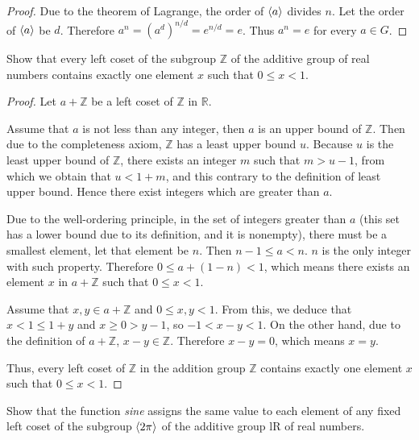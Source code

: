 \begin{proof}
    Due to the theorem of Lagrange, the order of $\left\langle{a}\right\rangle$ divides $n$. Let the order of $\left\langle{a}\right\rangle$ be $d$. Therefore $a^{n} = {(a^{d})}^{n/d} = e^{n/d} = e$. Thus $a^{n} = e$ for every $a\in G$.
\end{proof}

\newpage
\begin{exercise}
    Show that every left coset of the subgroup $\mathbb{Z}$ of the additive group of real numbers contains exactly one element $x$ such that $0\leq x < 1$.
\end{exercise}

\begin{proof}
    Let $a + \mathbb{Z}$ be a left coset of $\mathbb{Z}$ in $\mathbb{R}$.

    Assume that $a$ is not less than any integer, then $a$ is an upper bound of $\mathbb{Z}$. Then due to the completeness axiom, $\mathbb{Z}$ has a least upper bound $u$. Because $u$ is the least upper bound of $\mathbb{Z}$, there exists an integer $m$ such that $m > u - 1$, from which we obtain that $u < 1 + m$, and this contrary to the definition of least upper bound. Hence there exist integers which are greater than $a$.

    Due to the well-ordering principle, in the set of integers greater than $a$ (this set has a lower bound due to its definition, and it is nonempty), there must be a smallest element, let that element be $n$. Then $n - 1\leq a < n$. $n$ is the only integer with such property. Therefore $0\leq a + (1 - n) < 1$, which means there exists an element $x$ in $a + \mathbb{Z}$ such that $0\leq x < 1$.

    Assume that $x, y\in a + \mathbb{Z}$ and $0\leq x, y < 1$. From this, we deduce that $x < 1 \leq 1 + y$ and $x\ge 0 > y - 1$, so $-1 < x - y < 1$. On the other hand, due to the definition of $a + \mathbb{Z}$, $x - y\in\mathbb{Z}$. Therefore $x - y = 0$, which means $x = y$.

    Thus, every left coset of $\mathbb{Z}$ in the addition group $\mathbb{Z}$ contains exactly one element $x$ such that $0\leq x < 1$.
\end{proof}

\newpage
\begin{exercise}
    Show that the function \textit{sine} assigns the same value to each element of any fixed left coset of the subgroup $\left\langle{2\pi}\right\rangle$ of the additive group lR of real numbers.
\end{exercise}

